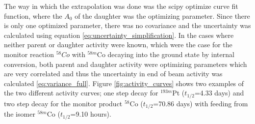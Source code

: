 \documentclass[a4paper,11pt,twoside]{book}
\begin{document}
The way in which the extrapolation was done was the scipy optimize curve fit function, where the $A_0$ of the daughter was the optimizing parameter. Since there is only one optimized parameter, there was no covariance and the uncertainty was calculated using equation \ref{eq:uncertainty_simplification}.  In the cases where neither parent or daughter activity were known, which were the case for the monitor reaction $^{58}Co$ with $^{58m}$Co decaying into the ground state by internal conversion, both parent and daughter activity were optimizing parameters which are very correlated and thus the uncertainty in end of beam activity was calculated \ref{eq:variance_full}. Figure \ref{fig:activity_curves} shows two examples of the two different activity curves; one step decay for $^{193m}$Pt ($t_{1/2}$=4.33 days) and two step decay for the monitor product $^{58}$Co ($t_{1/2}$=70.86 days) with feeding from the isomer $^{58m}$Co ($t_{1/2}$=9.10 hours).  
\end{document}
